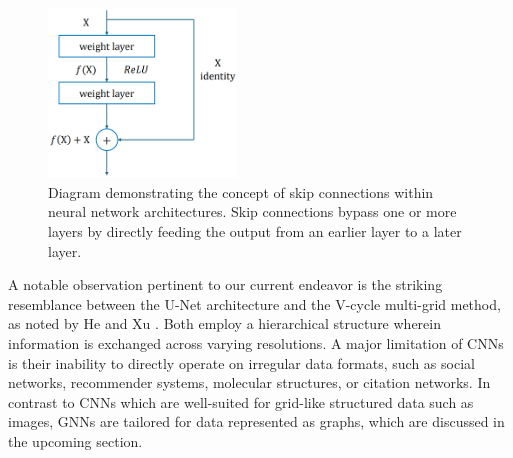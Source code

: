 \begin{figure}[ht]
    \centering
    \includegraphics[width=5cm]{images/Theory-DL/Skip.png}
    \caption{Diagram demonstrating the concept of skip connections within neural network architectures. Skip connections bypass one or more layers by directly feeding the output from an earlier layer to a later layer.} 
    \label{fig:Skip}
\end{figure}
A notable observation pertinent to our current endeavor is the striking resemblance between the U-Net architecture and the V-cycle multi-grid method, as noted by He and Xu \cite{HeXu2019}. Both employ a hierarchical structure wherein information is exchanged across varying resolutions.
A major limitation of CNNs is their inability to directly operate on irregular data formats, such as social networks, recommender systems, molecular structures, or citation networks. In contrast to CNNs which are well-suited for grid-like structured data such as images, GNNs are tailored for data represented as graphs, which are discussed in the upcoming section.

